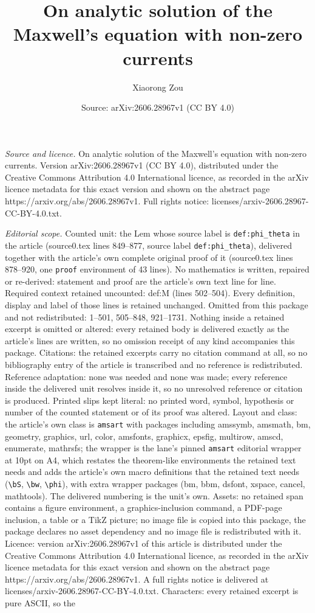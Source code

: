 \documentclass[10pt,a4paper]{amsart}
\title[On analytic solution of the Maxwell's equation with non-zero]{On analytic solution of the Maxwell's equation with non-zero currents}
\author{Xiaorong Zou}
\date{Source: arXiv:2606.28967v1 (CC BY 4.0)}
\begin{document}
\maketitle

\noindent\emph{Source and licence.} On analytic solution of the Maxwell's equation with non-zero currents. Version arXiv:2606.28967v1 (CC BY 4.0), distributed under the Creative Commons Attribution 4.0 International licence, as recorded in the arXiv licence metadata for this exact version and shown on the abstract page https://arxiv.org/abs/2606.28967v1. Full rights notice: licenses/arxiv-2606.28967-CC-BY-4.0.txt.\par\smallskip

\noindent\textit{Editorial scope.} Counted unit: the Lem whose source label is \texttt{def:phi\_theta} in the article (source0.tex lines 849--877, source label \texttt{def:phi\_theta}), delivered together with the article's own complete original proof of it (source0.tex lines 878--920, one \texttt{proof} environment of 43 lines). No mathematics is written, repaired or re-derived: statement and proof are the article's own text line for line. Required context retained uncounted: def:M (lines 502--504). Every definition, display and label of those lines is retained unchanged. Omitted from this package and not redistributed: 1--501, 505--848, 921--1731. Nothing inside a retained excerpt is omitted or altered: every retained body is delivered exactly as the article's lines are written, so no omission receipt of any kind accompanies this package. Citations: the retained excerpts carry no citation command at all, so no bibliography entry of the article is transcribed and no reference is redistributed. Reference adaptation: none was needed and none was made; every reference inside the delivered unit resolves inside it, so no unresolved reference or citation is produced. Printed slips kept literal: no printed word, symbol, hypothesis or number of the counted statement or of its proof was altered. Layout and class: the article's own class is \texttt{amsart} with packages including amssymb, amsmath, bm, geometry, graphics, url, color, amsfonts, graphicx, epsfig, multirow, amscd, enumerate, mathrsfs; the wrapper is the lane's pinned \texttt{amsart} editorial wrapper at 10pt on A4, which restates the theorem-like environments the retained text needs and adds the article's own macro definitions that the retained text needs (\texttt{\textbackslash bS}, \texttt{\textbackslash bw}, \texttt{\textbackslash phi}), with extra wrapper packages (bm, bbm, dsfont, xspace, cancel, mathtools). The delivered numbering is the unit's own. Assets: no retained span contains a figure environment, a graphics-inclusion command, a PDF-page inclusion, a table or a TikZ picture; no image file is copied into this package, the package declares no asset dependency and no image file is redistributed with it. Licence: version arXiv:2606.28967v1 of this article is distributed under the Creative Commons Attribution 4.0 International licence, as recorded in the arXiv licence metadata for this exact version and shown on the abstract page https://arxiv.org/abs/2606.28967v1. A full rights notice is delivered at licenses/arxiv-2606.28967-CC-BY-4.0.txt. Characters: every retained excerpt is pure ASCII, so the 
\end{document}
